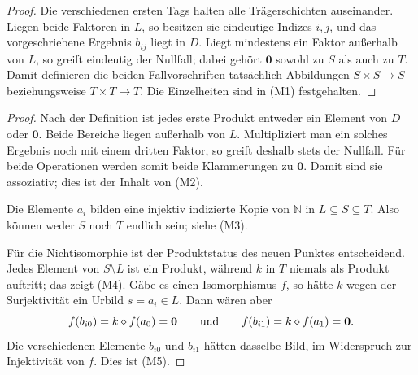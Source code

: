 \documentclass[main.tex]{subfiles}
\begin{document}
\begin{proof}
Die verschiedenen ersten Tags halten alle Trägerschichten auseinander.
Liegen beide Faktoren in \(L\),
so besitzen sie eindeutige Indizes \(i,j\), und das vorgeschriebene Ergebnis
\(b_{ij}\) liegt in \(D\). Liegt mindestens ein Faktor außerhalb von \(L\),
so greift eindeutig der Nullfall; dabei gehört \(\mathbf0\) sowohl zu \(S\)
als auch zu \(T\). Damit definieren die beiden Fallvorschriften tatsächlich
Abbildungen \(S\times S\to S\) beziehungsweise \(T\times T\to T\). Die
Einzelheiten sind in \textup{(M1)} festgehalten.
\end{proof}

\MogTableProofHeading
\begin{tabproofwide}
\end{tabproofwide}

\begin{proof}
Nach der Definition ist jedes erste Produkt entweder ein Element von \(D\)
oder \(\mathbf0\). Beide Bereiche liegen außerhalb von \(L\). Multipliziert
man ein solches Ergebnis noch mit einem dritten Faktor, so greift deshalb
stets der Nullfall. Für beide Operationen werden somit beide Klammerungen zu
\(\mathbf0\). Damit sind sie assoziativ; dies ist der Inhalt von
\textup{(M2)}.

Die Elemente \(a_i\) bilden eine injektiv indizierte Kopie von
\(\mathbb N\) in \(L\subseteq S\subseteq T\). Also können weder \(S\) noch
\(T\) endlich sein; siehe \textup{(M3)}.

Für die Nichtisomorphie ist der Produktstatus des neuen Punktes entscheidend.
Jedes Element von \(S\setminus L\) ist ein Produkt, während \(k\) in \(T\)
niemals als Produkt auftritt; das zeigt \textup{(M4)}. Gäbe es einen
Isomorphismus \(f\), so hätte \(k\) wegen der Surjektivität ein Urbild
\(s=a_i\in L\). Dann wären aber
\[
  f(b_{i0})=k\mathbin{\diamond} f(a_0)=\mathbf0
  \qquad\text{und}\qquad
  f(b_{i1})=k\mathbin{\diamond} f(a_1)=\mathbf0.
\]
Die verschiedenen Elemente \(b_{i0}\) und \(b_{i1}\) hätten dasselbe Bild,
im Widerspruch zur Injektivität von \(f\). Dies ist \textup{(M5)}.
\end{proof}
\end{document}
